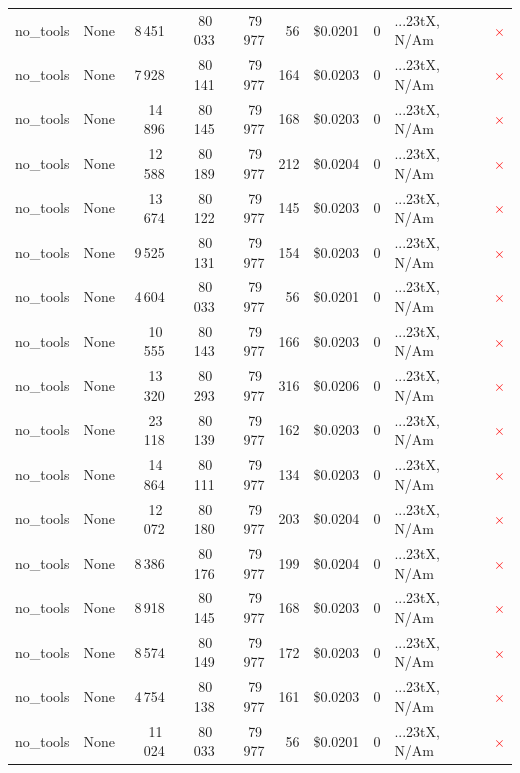 \documentclass[a4paper,11pt]{article}
\begin{document}
\begin{table}[H]
{\begin{tabular}{l r r r r r r r l c}
no\_tools & None & 8\,451 & 80\,033 & 79\,977 & 56 & \$0.0201 & 0 & ...23tX, N/Am & \textcolor{red}{\(\times\)} \\
no\_tools & None & 7\,928 & 80\,141 & 79\,977 & 164 & \$0.0203 & 0 & ...23tX, N/Am & \textcolor{red}{\(\times\)} \\
no\_tools & None & 14\,896 & 80\,145 & 79\,977 & 168 & \$0.0203 & 0 & ...23tX, N/Am & \textcolor{red}{\(\times\)} \\
no\_tools & None & 12\,588 & 80\,189 & 79\,977 & 212 & \$0.0204 & 0 & ...23tX, N/Am & \textcolor{red}{\(\times\)} \\
no\_tools & None & 13\,674 & 80\,122 & 79\,977 & 145 & \$0.0203 & 0 & ...23tX, N/Am & \textcolor{red}{\(\times\)} \\
no\_tools & None & 9\,525 & 80\,131 & 79\,977 & 154 & \$0.0203 & 0 & ...23tX, N/Am & \textcolor{red}{\(\times\)} \\
no\_tools & None & 4\,604 & 80\,033 & 79\,977 & 56 & \$0.0201 & 0 & ...23tX, N/Am & \textcolor{red}{\(\times\)} \\
no\_tools & None & 10\,555 & 80\,143 & 79\,977 & 166 & \$0.0203 & 0 & ...23tX, N/Am & \textcolor{red}{\(\times\)} \\
no\_tools & None & 13\,320 & 80\,293 & 79\,977 & 316 & \$0.0206 & 0 & ...23tX, N/Am & \textcolor{red}{\(\times\)} \\
no\_tools & None & 23\,118 & 80\,139 & 79\,977 & 162 & \$0.0203 & 0 & ...23tX, N/Am & \textcolor{red}{\(\times\)} \\
no\_tools & None & 14\,864 & 80\,111 & 79\,977 & 134 & \$0.0203 & 0 & ...23tX, N/Am & \textcolor{red}{\(\times\)} \\
no\_tools & None & 12\,072 & 80\,180 & 79\,977 & 203 & \$0.0204 & 0 & ...23tX, N/Am & \textcolor{red}{\(\times\)} \\
no\_tools & None & 8\,386 & 80\,176 & 79\,977 & 199 & \$0.0204 & 0 & ...23tX, N/Am & \textcolor{red}{\(\times\)} \\
no\_tools & None & 8\,918 & 80\,145 & 79\,977 & 168 & \$0.0203 & 0 & ...23tX, N/Am & \textcolor{red}{\(\times\)} \\
no\_tools & None & 8\,574 & 80\,149 & 79\,977 & 172 & \$0.0203 & 0 & ...23tX, N/Am & \textcolor{red}{\(\times\)} \\
no\_tools & None & 4\,754 & 80\,138 & 79\,977 & 161 & \$0.0203 & 0 & ...23tX, N/Am & \textcolor{red}{\(\times\)} \\
no\_tools & None & 11\,024 & 80\,033 & 79\,977 & 56 & \$0.0201 & 0 & ...23tX, N/Am & \textcolor{red}{\(\times\)} \\

\end{tabular}}
\end{table}
\end{document}
